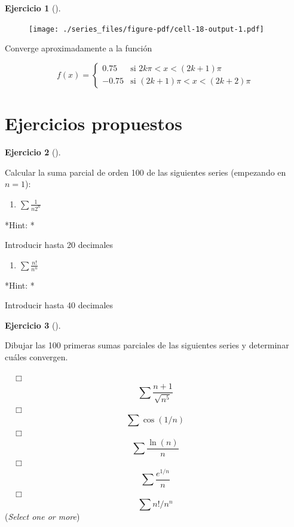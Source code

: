 \documentclass[
  a4paper,
]{scrreport}
\providecommand{\tightlist}{%
  \setlength{\itemsep}{0pt}\setlength{\parskip}{0pt}}\usepackage{longtable,booktabs,array}
\theoremstyle{definition}
\newtheorem{exercise}{Ejercicio}[chapter]
\theoremstyle{remark}
\begin{document}
\begin{exercise}[]
\begin{tcolorbox}
\begin{figure}[H]

{\centering \texttt{[image: ./series\_files/figure-pdf/cell-18-output-1.pdf]}

}

\end{figure}

Converge aproximadamente a la función

\[
f(x)=\begin{cases}
0.75 & \mbox{si $2k\pi<x<(2k+1)\pi$}\\
-0.75 & \mbox{si $(2k+1)\pi<x<(2k+2)\pi$}
\end{cases}
\]

\end{tcolorbox}

\end{exercise}

\hypertarget{ejercicios-propuestos-4}{%
\section{Ejercicios propuestos}\label{ejercicios-propuestos-4}}

\leavevmode{}%
\begin{exercise}[]\label{exr-series-propuesto-1}

Calcular la suma parcial de orden 100 de las siguientes series
(empezando en \(n=1\)):

\begin{enumerate}
\def\labelenumi{\alph{enumi}.}
\tightlist
\item
  \(\sum \frac{1}{n2^n}\)
\end{enumerate}

\vspace{18pt}*Hint: *

Introducir hasta 20 decimales

\begin{enumerate}
\def\labelenumi{\alph{enumi}.}
\setcounter{enumi}{1}
\tightlist
\item
  \(\sum \frac{n!}{n^n}\)
\end{enumerate}

\vspace{18pt}*Hint: *

Introducir hasta 40 decimales

\end{exercise}

\leavevmode{}%
\begin{exercise}[]\label{exr-series-propuesto-2}

Dibujar las 100 primeras sumas parciales de las siguientes series y
determinar cuáles convergen.

${\quad\Box}$ $$\sum \frac{n+1}{\sqrt{n^5}}$$
${\quad\Box}$ $$\sum  \cos(1/n)$$
${\quad\Box}$ $$\sum \frac{\ln(n)}{n}$$
${\quad\Box}$ $$\sum \frac{e^{1/n}}{n}$$
${\quad\Box}$ $$\sum n!/n^n$$
(\emph{Select one or more})

\end{exercise}
\end{document}
